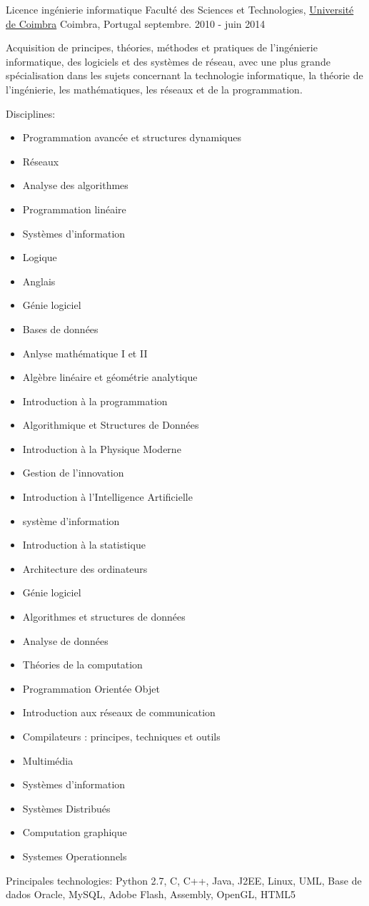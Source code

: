 \begin{cventries}
\cventry
{Licence ingénierie informatique} %
{Faculté des Sciences et Technologies, \href{https://www.uc.pt/}{Université de Coimbra}} %
{Coimbra, Portugal} %
{septembre. 2010 - juin 2014} %
{  %
\begin{cvitems}
\item {Acquisition de principes, théories, méthodes et pratiques de l'ingénierie informatique, des logiciels et des systèmes de réseau, avec une plus grande spécialisation dans les sujets concernant la technologie informatique, la théorie de l'ingénierie, les mathématiques, les réseaux et de la programmation.}
\item{Disciplines:}
\begin{itemize}
\item Programmation avancée et structures dynamiques
\item Réseaux
\item Analyse des algorithmes
\item Programmation linéaire
\item Systèmes d’information
\item Logique
\item Anglais
\item Génie logiciel
\item Bases de données
\item Anlyse mathématique I et II
\item Algèbre linéaire et géométrie analytique
\item Introduction à la programmation
\item Algorithmique et Structures de Données
\item Introduction à la Physique Moderne
\item Gestion de l'innovation
\item Introduction à l'Intelligence Artificielle
\item système d'information
\item Introduction à la statistique
\item Architecture des ordinateurs
\item Génie logiciel
\item Algorithmes et structures de données
\item Analyse de données
\item Théories de la computation
\item Programmation Orientée Objet
\item Introduction aux réseaux de communication
\item Compilateurs : principes, techniques et outils
\item Multimédia
\item Systèmes d'information
\item Systèmes Distribués
\item Computation graphique
\item Systemes Operationnels
\end{itemize}
\item{Principales technologies: Python 2.7, C, C++, Java, J2EE, Linux, UML, Base de dados Oracle, MySQL, Adobe Flash, Assembly, OpenGL, HTML5 }
\end{cvitems}
}



\end{cventries}
